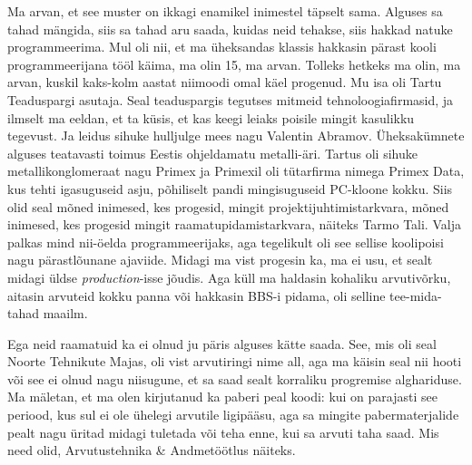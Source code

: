 Ma arvan, et see muster on ikkagi enamikel inimestel täpselt sama. Alguses sa 
tahad mängida, siis sa tahad aru saada, kuidas neid tehakse, siis hakkad natuke 
programmeerima. Mul oli nii, et ma üheksandas klassis hakkasin pärast kooli 
programmeerijana tööl käima,  ma olin 15, ma arvan. Tolleks hetkeks ma olin, ma 
arvan, kuskil kaks-kolm aastat niimoodi omal käel progenud. Mu isa oli Tartu 
Teaduspargi asutaja. Seal teaduspargis tegutses  
mitmeid tehnoloogiafirmasid, 
ja ilmselt ma eeldan, et ta küsis, et kas keegi leiaks poisile mingit kasulikku 
tegevust. Ja leidus sihuke hulljulge mees nagu Valentin 
Abramov. Üheksakümnete alguses teatavasti toimus 
Eestis ohjeldamatu metalli-äri. Tartus oli sihuke metallikonglomeraat nagu 
Primex ja Primexil oli tütarfirma nimega Primex Data, kus 
tehti igasuguseid asju, põhiliselt pandi mingisuguseid PC-kloone kokku. Siis 
olid seal mõned inimesed, kes progesid, mingit projektijuhtimistarkvara, mõned 
inimesed, kes progesid mingit raamatupidamistarkvara, näiteks Tarmo 
Tali. Valja palkas mind nii-öelda programmeerijaks, 
aga tegelikult oli see sellise koolipoisi nagu pärastlõunane ajaviide. Midagi 
ma vist progesin ka, ma ei usu, et sealt midagi üldse \emph{production}-isse 
jõudis. Aga küll ma haldasin kohaliku arvutivõrku, aitasin arvuteid kokku 
panna või hakkasin BBS-i pidama, oli selline tee-mida-tahad  maailm.


Ega neid raamatuid ka ei olnud ju päris alguses kätte saada. See, mis oli seal 
Noorte Tehnikute Majas, oli vist 
arvutiringi nime all, aga ma käisin seal nii hooti või see ei olnud nagu 
niisugune, et sa saad sealt  korraliku progremise alghariduse. Ma mäletan, et 
ma 
olen kirjutanud ka paberi peal koodi: kui on parajasti see periood, kus sul 
ei ole ühelegi arvutile ligipääsu, aga sa mingite pabermaterjalide pealt nagu 
üritad midagi tuletada või teha enne, kui sa arvuti taha saad. Mis need olid, 
Arvutustehnika \& Andmetöötlus 
näiteks. 


